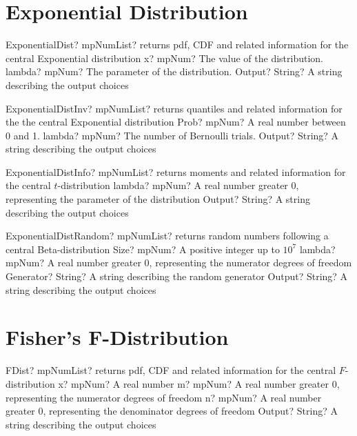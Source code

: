 \documentclass[12pt,a4paper,openany]{book}
\begin{document}
\section{Exponential Distribution}

\begin{mpFunctionsExtract}
\mpFunctionThree
{ExponentialDist? mpNumList? returns pdf, CDF and related information for the central Exponential distribution}
{x? mpNum? The value of the distribution.}
{lambda? mpNum? The parameter of the distribution.}
{Output? String? A string describing the output choices}
\end{mpFunctionsExtract}

\begin{mpFunctionsExtract}
\mpFunctionThree
{ExponentialDistInv? mpNumList? returns quantiles and related information for the the central Exponential distribution}
{Prob? mpNum? A real number between 0 and 1.}
{lambda? mpNum? The number of Bernoulli trials.}
{Output? String? A string describing the output choices}
\end{mpFunctionsExtract}

\begin{mpFunctionsExtract}
\mpFunctionTwo
{ExponentialDistInfo? mpNumList? returns moments and related information for the central $t$-distribution}
{lambda? mpNum? A real number greater 0, representing the parameter of the distribution}
{Output? String? A string describing the output choices}
\end{mpFunctionsExtract}

\begin{mpFunctionsExtract}
\mpFunctionFour
{ExponentialDistRandom? mpNumList? returns random numbers following a central Beta-distribution}
{Size? mpNum? A positive integer up to $10^7$}
{lambda? mpNum? A real number greater 0, representing the numerator  degrees of freedom}
{Generator? String? A string describing the random generator}
{Output? String? A string describing the output choices}
\end{mpFunctionsExtract}

\section{Fisher's F-Distribution}

\begin{mpFunctionsExtract}
\mpFunctionFour
{FDist? mpNumList? returns pdf, CDF and related information for the central $F$-distribution}
{x? mpNum? A real number}
{m? mpNum? A real number greater 0, representing the numerator  degrees of freedom}
{n? mpNum? A real number greater 0, representing the denominator degrees of freedom}
{Output? String? A string describing the output choices}
\end{mpFunctionsExtract}
\end{document}

